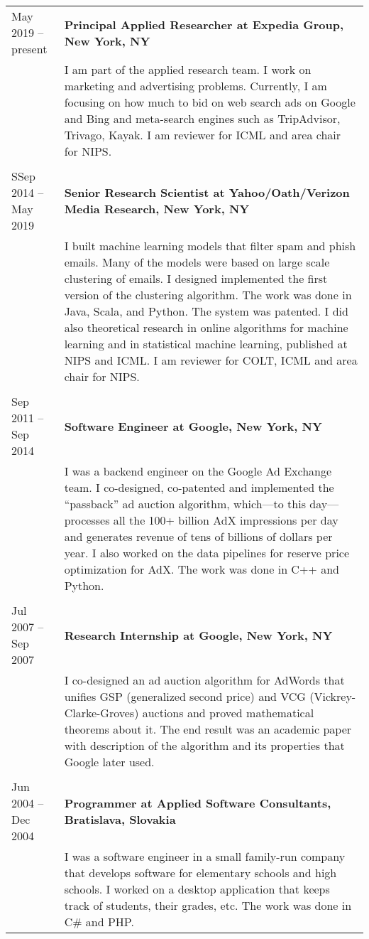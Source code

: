 \documentclass[9pt]{article}
\newcommand{\smallfont}{\small}
\begin{document}
\begin{longtable}{@{}lp{13cm}}
May 2019 -- present & \textbf{Principal Applied Researcher at Expedia Group, New York, NY} \\
& {\smallfont I am part of the applied research team. I work on marketing and advertising
problems. Currently, I am focusing on how much to bid on web search ads on Google and Bing
and meta-search engines such as TripAdvisor, Trivago, Kayak.
I am reviewer for ICML and area chair for NIPS.
} \\
\\
SSep 2014 -- May 2019 & \textbf{Senior Research Scientist at Yahoo/Oath/Verizon Media Research, New York, NY} \\
& {\smallfont I built machine learning models that filter spam and phish emails. Many of the
models were based on large scale clustering of emails. I designed implemented
the first version of the clustering algorithm. The work was done in Java, Scala,
and Python. The system was patented. I did also theoretical research in online
algorithms for machine learning and in statistical machine learning, published
at NIPS and ICML. I am reviewer for COLT, ICML and area chair for NIPS.} \\
\\
Sep 2011 -- Sep 2014 & \textbf{Software Engineer at Google, New York, NY} \\
& {\smallfont I was a backend engineer on the Google Ad Exchange team. I
co-designed, co-patented and implemented the ``passback'' ad auction algorithm,
which---to this day---processes all the 100+ billion AdX impressions per day and
generates revenue of tens of billions of dollars per year. I also worked on the
data pipelines for reserve price optimization for AdX. The work was done in C++
and Python.} \\
\\
Jul 2007 -- Sep 2007 & \textbf{Research Internship at Google, New York, NY} \\
& {\smallfont I co-designed an ad auction algorithm for AdWords that unifies GSP
(generalized second price) and VCG (Vickrey-Clarke-Groves) auctions and proved
mathematical theorems about it. The end result was an academic paper with description
of the algorithm and its properties that Google later used.} \\
\\
Jun 2004 -- Dec 2004 & \textbf{Programmer at Applied Software Consultants, Bratislava, Slovakia} \\
& {\smallfont I was a software engineer in a small family-run company that
develops software for elementary schools and high schools. I worked on a desktop
application that keeps track of students, their grades, etc. The work was done in
C\# and PHP.} \\
\end{longtable}
\end{document}
